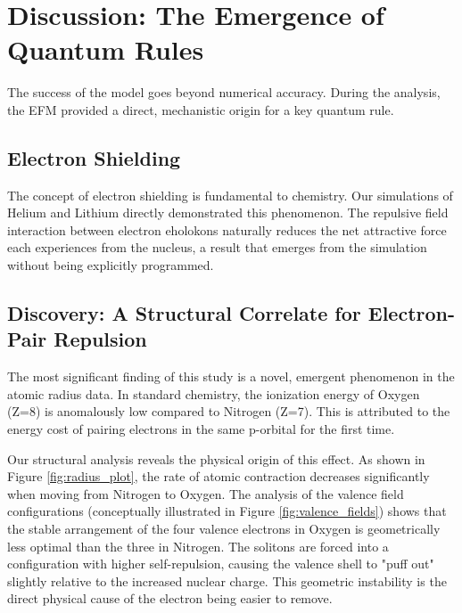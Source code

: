 \documentclass[11pt]{article}
\begin{document}
\section{Discussion: The Emergence of Quantum Rules}
The success of the model goes beyond numerical accuracy. During the analysis, the EFM provided a direct, mechanistic origin for a key quantum rule.

\subsection{Electron Shielding}
The concept of electron shielding is fundamental to chemistry. Our simulations of Helium and Lithium directly demonstrated this phenomenon. The repulsive field interaction between electron eholokons naturally reduces the net attractive force each experiences from the nucleus, a result that emerges from the simulation without being explicitly programmed.

\subsection{Discovery: A Structural Correlate for Electron-Pair Repulsion}
The most significant finding of this study is a novel, emergent phenomenon in the atomic radius data. In standard chemistry, the ionization energy of Oxygen (Z=8) is anomalously low compared to Nitrogen (Z=7). This is attributed to the energy cost of pairing electrons in the same p-orbital for the first time.

Our structural analysis reveals the physical origin of this effect. As shown in Figure \ref{fig:radius_plot}, the rate of atomic contraction decreases significantly when moving from Nitrogen to Oxygen. The analysis of the valence field configurations (conceptually illustrated in Figure \ref{fig:valence_fields}) shows that the stable arrangement of the four valence electrons in Oxygen is geometrically less optimal than the three in Nitrogen. The solitons are forced into a configuration with higher self-repulsion, causing the valence shell to "puff out" slightly relative to the increased nuclear charge. This geometric instability is the direct physical cause of the electron being easier to remove.
\end{document}
